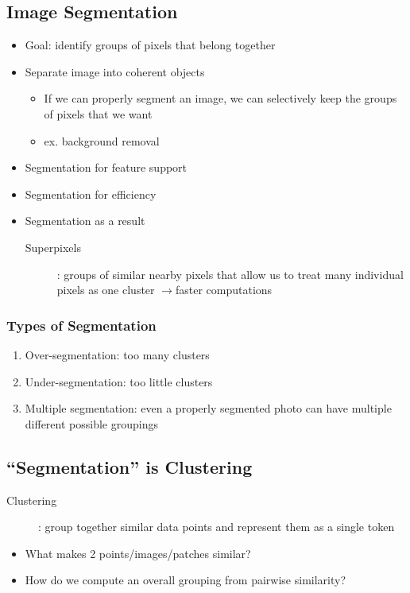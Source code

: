 \documentclass[letterpaper,12pt]{article}
\newcommand{\lra}{\ensuremath{\longrightarrow{}}}
\begin{document}
\subsection{Image Segmentation}
\begin{itemize}
 \item Goal: identify groups of pixels that belong together
 \item Separate image into coherent objects
       \begin{itemize}
        \item If we can properly segment an image, we can selectively keep the groups of pixels that we want
        \item ex. background removal
       \end{itemize}
 \item Segmentation for feature support
 \item Segmentation for efficiency
 \item Segmentation as a result
       \begin{description}
        \item[Superpixels]: groups of similar nearby pixels that allow us to treat many individual pixels as one cluster \lra faster computations
       \end{description}
\end{itemize}

\subsubsection{Types of Segmentation}
\begin{enumerate}
 \item Over-segmentation: too many clusters
 \item Under-segmentation: too little clusters
 \item Multiple segmentation: even a properly segmented photo can have multiple different possible groupings
\end{enumerate}

\subsection{``Segmentation'' is Clustering}
\begin{description}
 \item[Clustering]: group together similar data points and represent them as a single token
\end{description}
\begin{itemize}
 \item What makes 2 points/images/patches similar?
 \item How do we compute an overall grouping from pairwise similarity?
\end{itemize}
\end{document}
